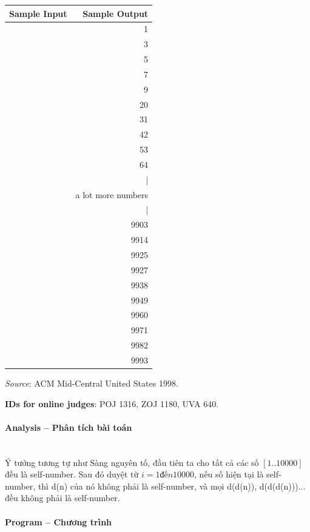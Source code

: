 \documentclass{article}
\begin{document}
\begin{table}[h]
    \centering
    \begin{tabular}{|l|r|}
        \hline
        \textbf{Sample Input} & \textbf{Sample Output} \\
        \hline
            & 1  \\ 
            & 3 \\ 
            & 5 \\ 
            & 7 \\ 
            & 9 \\ 
            & 20 \\
			& 31 \\
			& 42 \\
			& 53 \\
			& 64 \\
			& | \\
			& a lot more numbers \\
			& | \\
			& 9903 \\
			& 9914 \\
			& 9925 \\
			& 9927 \\
			& 9938 \\
			& 9949 \\
			& 9960 \\
			& 9971 \\
			& 9982 \\
			& 9993 \\
			\hline
    \end{tabular}
\end{table}


\textit{Source}: ACM Mid-Central United States 1998.

\textbf{IDs for online judges}: POJ 1316, ZOJ 1180, UVA 640.


\paragraph{Analysis -- Phân tích bài toán} \mbox{} \\

Ý tưởng tương tự như Sàng nguyên tố, đầu tiên ta cho tất cả các số $[1..10000]$ đều
là self-number. Sau đó duyệt từ $i = 1 đến 10000$, nếu số hiện tại là self-number, thì 
d(n) của nó không phải là self-number, và mọi d(d(n)), d(d(d(n)))... đều không phải là self-number.
\paragraph{Program -- Chương trình} \mbox{} \\
\end{document}
